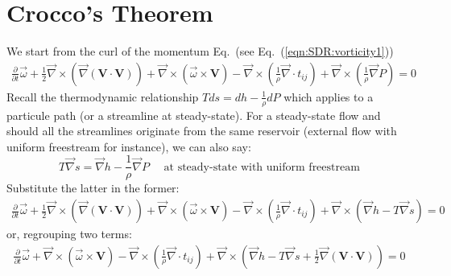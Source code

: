 \documentclass{warpdoc}
\newcommand{\mfd}{\displaystyle}
\begin{document}
\section{Crocco's Theorem}


We start from the curl of the momentum Eq.\ (see Eq.\ (\ref{eqn:SDR:vorticity1}))
%
\begin{equation}
 \label{eqn:Crocco:vorticity1}
 \begin{array}{r}
  \mfd\frac{\partial}{\partial t} \vec{\omega}
      + \frac{1}{2} \vec{\nabla} \times \left( \vec{\nabla} \left( \bm{V} \cdot \bm{V} \right)\right)
       +\vec{\nabla} \times \left(\vec{\omega} \times \bm{V}\right)
      - \vec{\nabla} \times \left( \frac{1}{\rho} \vec{\nabla} \cdot t_{ij} \right)
      + \vec{\nabla} \times \left( \frac{1}{\rho} \vec{\nabla} P \right)
      = 0
 \end{array}
\end{equation}
%
Recall the thermodynamic relationship $T ds=dh - \frac{1}{\rho} dP$ which applies to a particule path (or a streamline at steady-state). For a steady-state flow and should all the streamlines originate from the same reservoir (external flow with uniform freestream for instance), we can also say:
%
\begin{equation}
  \label{eqn:Crocco:Tds}
  T \vec{\nabla} s = \vec{\nabla} h - \frac{1}{\rho} \vec{\nabla} P ~~~~~~\textrm{at steady-state with uniform freestream}
\end{equation}
%
Substitute the latter in the former:
%
\begin{equation}
 \label{eqn:Crocco:vorticity2}
 \begin{array}{r}
  \mfd\frac{\partial}{\partial t} \vec{\omega}
      + \frac{1}{2} \vec{\nabla} \times \left( \vec{\nabla} \left( \bm{V} \cdot \bm{V} \right)\right)
       +\vec{\nabla} \times \left(\vec{\omega} \times \bm{V}\right)
      - \vec{\nabla} \times \left( \frac{1}{\rho} \vec{\nabla} \cdot t_{ij} \right)
      + \vec{\nabla} \times \left( \vec{\nabla} h - T \vec{\nabla} s\right)
      = 0
 \end{array}
\end{equation}
%
or, regrouping two terms:
%
\begin{equation}
 \label{eqn:Crocco:vorticity3}
 \begin{array}{r}
  \mfd\frac{\partial}{\partial t} \vec{\omega}
       +\vec{\nabla} \times \left(\vec{\omega} \times \bm{V}\right)
      - \vec{\nabla} \times \left( \frac{1}{\rho} \vec{\nabla} \cdot t_{ij} \right)
      + \vec{\nabla} \times \left( \vec{\nabla} h - T \vec{\nabla} s
           +\frac{1}{2}\vec{\nabla} \left( \bm{V} \cdot \bm{V} \right) \right)
      = 0
 \end{array}
\end{equation}
\end{document}
